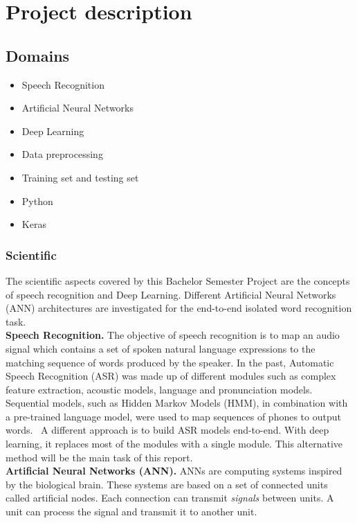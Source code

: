 
\section{Project description}
\subsection{Domains}

\begin{itemize}
        \item Speech Recognition
        \item Artificial Neural Networks
        \item Deep Learning 
        \item Data preprocessing
        \item Training set and testing set
        \item Python
        \item Keras
\end{itemize}

\subsubsection{Scientific}

The scientific aspects covered by this Bachelor Semester Project are the
concepts of speech recognition and Deep Learning. Different Artificial Neural
Networks (ANN) architectures are investigated for the end-to-end isolated word
recognition task.\\

\textbf{Speech Recognition.} The objective of speech recognition is to map an
audio signal which contains a set of spoken natural language expressions to the
matching sequence of words produced by the speaker. In the past, Automatic
Speech Recognition (ASR) was made up of different modules such as complex
feature extraction, acoustic models, language and pronunciation
models.~\cite{DBLP:journals/corr/AmodeiABCCCCCCD15} Sequential models, such as
Hidden Markov Models (HMM), in combination with a pre-trained language model,
were used to map sequences of phones to output words.~\cite{Williamsong} A
different approach is to build ASR models end-to-end. With deep learning, it
replaces most of the modules with a single module. This alternative method will
be the main task of this report.\\

\textbf{Artificial Neural Networks (ANN).} ANNs are computing systems inspired
by the biological brain. These systems are based on a set of connected units
called artificial nodes. Each connection can transmit \textit{signals} between
units. A unit can process the signal and transmit it to another unit.\\

